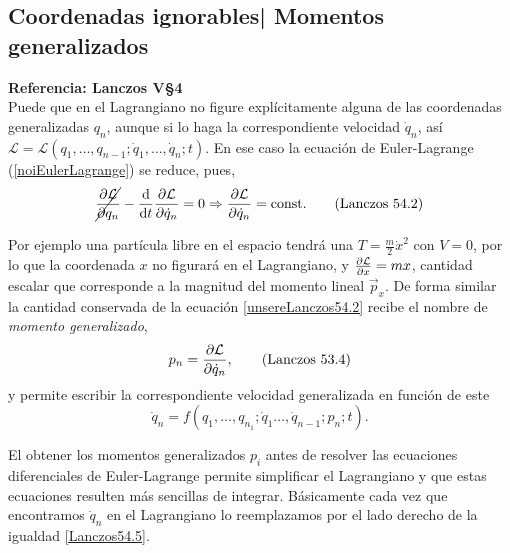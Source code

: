 \documentclass[12pt, spanish, a4paper, ]{article}
\begin{document}
\subsection{Coordenadas ignorables| Momentos generalizados} %
\textbf{Referencia: Lanczos V\S4}\\

Puede que en el Lagrangiano no figure explícitamente alguna de las coordenadas generalizadas \(q_n\), aunque si lo haga la correspondiente velocidad \(\dot{q}_n\), así \(\mathcal{L} = \mathcal{L}(q_1,\ldots,q_{n-1};\dot{q}_1,\ldots,\dot{q}_n;t)\).
En ese caso la ecuación de Euler-Lagrange (\ref{noiEulerLagrange}) se reduce, pues, 
\begin{equation}\label{unsereLanczos54.2}
    \cancel{\pdv{\mathcal{L}}{q_n}} - \dv{t} \pdv{\mathcal{L}}{\dot{q}_n}= 0 \Rightarrow \pdv{\mathcal{L}}{\dot{q}_n}= \mathrm{const.}
    \tag{Lanczos 54.2}
\end{equation}

Por ejemplo una partícula libre en el espacio tendrá una \(T= \frac{m}{2} \dot{x}^2\) con \(V=0\), por lo que la coordenada \(x\) no figurará en el Lagrangiano, y \(\pdv{\mathcal{L}}{x}= m x\), cantidad escalar que corresponde a la magnitud del momento lineal \(\vec{p}_x\).
De forma similar la cantidad conservada de la ecuación \eqref{unsereLanczos54.2} recibe el nombre de \emph{momento generalizado},
\begin{equation}\label{Lanczos53.4}
	p_n= \pdv{\mathcal{L}}{\dot{q}_n},
    \tag{Lanczos 53.4}
\end{equation}
y permite escribir la correspondiente velocidad generalizada en función de este
\begin{equation}\label{Lanczos54.5}
	\dot{q}_n= f(q_1, \ldots, q_{n_1};\dot{q}_1 \ldots, \dot{q}_{n-1};p_n;t).
    \tag{Lanczos 54.5}
\end{equation}

El obtener los momentos generalizados \(p_i\) antes de resolver las ecuaciones diferenciales de Euler-Lagrange permite simplificar el Lagrangiano y que estas ecuaciones resulten más sencillas de integrar.
Básicamente cada vez que encontramos \(\dot{q}_n\) en el Lagrangiano lo reemplazamos por el lado derecho de la igualdad \eqref{Lanczos54.5}.
\end{document}
